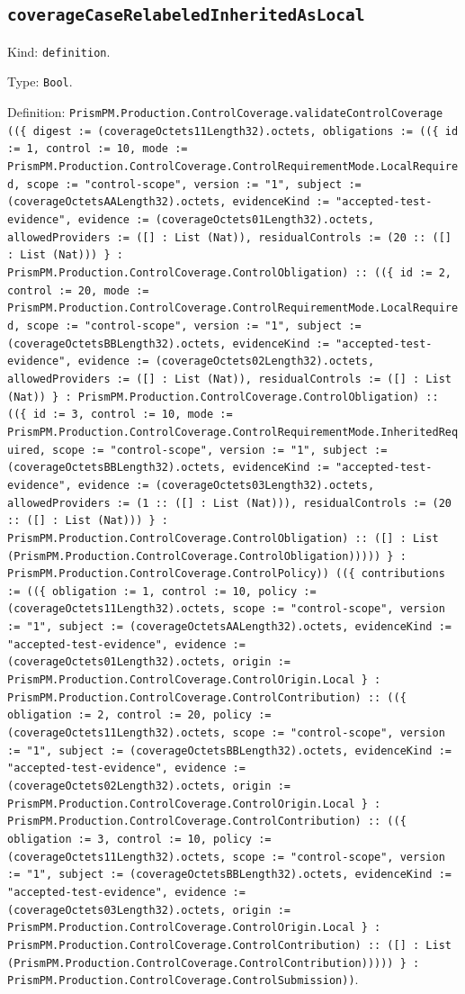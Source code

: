 \documentclass[11pt]{article}
\begin{document}
\subsection*{\texttt{coverageCaseRelabeledInheritedAsLocal}}
\noindent Kind: \texttt{definition}.\par
\noindent Type: \texttt{Bool}.\par
\noindent Definition: \texttt{PrismPM.Production.ControlCoverage.validateControlCoverage ((\{ digest := (coverageOctets11Length32).octets, obligations := ((\{ id := 1, control := 10, mode := PrismPM.Production.ControlCoverage.ControlRequirementMode.LocalRequired, scope := "control-scope", version := "1", subject := (coverageOctetsAALength32).octets, evidenceKind := "accepted-test-evidence", evidence := (coverageOctets01Length32).octets, allowedProviders := ([] : List (Nat)), residualControls := (20 :: ([] : List (Nat))) \} : PrismPM.Production.ControlCoverage.ControlObligation) :: ((\{ id := 2, control := 20, mode := PrismPM.Production.ControlCoverage.ControlRequirementMode.LocalRequired, scope := "control-scope", version := "1", subject := (coverageOctetsBBLength32).octets, evidenceKind := "accepted-test-evidence", evidence := (coverageOctets02Length32).octets, allowedProviders := ([] : List (Nat)), residualControls := ([] : List (Nat)) \} : PrismPM.Production.ControlCoverage.ControlObligation) :: ((\{ id := 3, control := 10, mode := PrismPM.Production.ControlCoverage.ControlRequirementMode.InheritedRequired, scope := "control-scope", version := "1", subject := (coverageOctetsBBLength32).octets, evidenceKind := "accepted-test-evidence", evidence := (coverageOctets03Length32).octets, allowedProviders := (1 :: ([] : List (Nat))), residualControls := (20 :: ([] : List (Nat))) \} : PrismPM.Production.ControlCoverage.ControlObligation) :: ([] : List (PrismPM.Production.ControlCoverage.ControlObligation))))) \} : PrismPM.Production.ControlCoverage.ControlPolicy)) ((\{ contributions := ((\{ obligation := 1, control := 10, policy := (coverageOctets11Length32).octets, scope := "control-scope", version := "1", subject := (coverageOctetsAALength32).octets, evidenceKind := "accepted-test-evidence", evidence := (coverageOctets01Length32).octets, origin := PrismPM.Production.ControlCoverage.ControlOrigin.Local \} : PrismPM.Production.ControlCoverage.ControlContribution) :: ((\{ obligation := 2, control := 20, policy := (coverageOctets11Length32).octets, scope := "control-scope", version := "1", subject := (coverageOctetsBBLength32).octets, evidenceKind := "accepted-test-evidence", evidence := (coverageOctets02Length32).octets, origin := PrismPM.Production.ControlCoverage.ControlOrigin.Local \} : PrismPM.Production.ControlCoverage.ControlContribution) :: ((\{ obligation := 3, control := 10, policy := (coverageOctets11Length32).octets, scope := "control-scope", version := "1", subject := (coverageOctetsBBLength32).octets, evidenceKind := "accepted-test-evidence", evidence := (coverageOctets03Length32).octets, origin := PrismPM.Production.ControlCoverage.ControlOrigin.Local \} : PrismPM.Production.ControlCoverage.ControlContribution) :: ([] : List (PrismPM.Production.ControlCoverage.ControlContribution))))) \} : PrismPM.Production.ControlCoverage.ControlSubmission))}.\par
\end{document}
